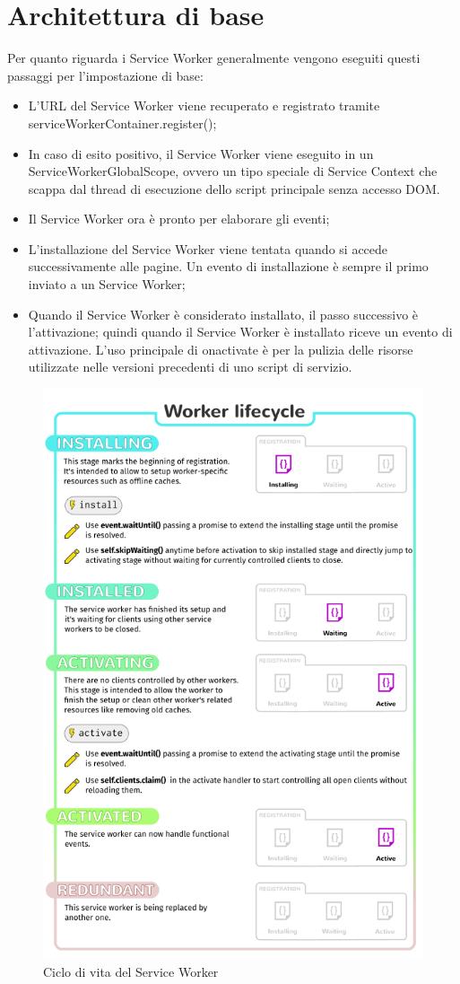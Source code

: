 \documentclass[italian]{article}
\begin{document}
\section{Architettura di base}
Per quanto riguarda i Service Worker generalmente vengono eseguiti questi passaggi per l'impostazione di base:
\begin{itemize}
\item L'URL del Service Worker viene recuperato e registrato tramite serviceWorkerContainer.register();
\item In caso di esito positivo, il Service Worker viene eseguito in un ServiceWorkerGlobalScope, ovvero un tipo speciale di Service Context che scappa dal thread di esecuzione dello script principale senza accesso DOM.
\item Il Service Worker ora è pronto per elaborare gli eventi;
\item L'installazione del Service Worker viene tentata quando si accede successivamente alle pagine. Un evento di installazione è sempre il primo inviato a un Service Worker;
\item Quando il Service Worker  è considerato installato, il passo successivo è l'attivazione; quindi quando il Service Worker è installato riceve un evento di attivazione. L'uso principale di onactivate è per la pulizia delle risorse utilizzate nelle versioni precedenti di uno script di servizio.
\end{itemize}
\begin{figure}[h]
	\centering
	\includegraphics[width=0.6\linewidth]{SwLifecycle}
	\caption{Ciclo di vita del Service Worker}
	\label{fig:Ciclo di vita del Service Worker}
\end{figure}
\pagebreak
\newpage
\end{document}
